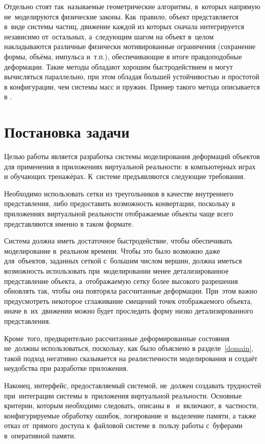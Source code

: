 \documentclass[a4paper, 14pt, titlepage]{extarticle}
\begin{document}
    Отдельно стоят так~называемые геометрические алгоритмы, в~которых напрямую не~моделируются
    физические законы. Как~правило, объект представляется в~виде системы частиц, движение каждой из
    которых сначала интегрируется независимо от~остальных, а~следующим шагом на объект в~целом
    накладываются различные физически мотивированные ограничения (сохранение формы, объёма, импульса
    и~т.п.), обеспечивающие в итоге правдоподобные деформации. Такие методы обладают хорошим
    быстродействием и могут вычисляться параллельно, при этом обладая большей устойчивостью и
    простотой в конфигурации, чем системы масс и пружин. Пример такого метода описывается в \cite{mueller-meshless}.

  \section{Постановка задачи}

    Целью работы является разработка системы моделирования деформаций объектов для применения в
    приложениях виртуальной реальности: в компьютерных играх и обучающих тренажёрах.
    К~системе предъявляются следующие требования.

    Необходимо использовать сетки из треугольников в качестве внутреннего представления, либо
    предоставить возможность конвертации, поскольку в приложениях виртуальной реальности отображаемые объекты
    чаще всего представляются именно в таком формате.

    Система должна иметь достаточное быстродействие, чтобы обеспечивать моделирование в~реальном
    времени. Чтобы это было возможно даже для~объектов, заданных сеткой с~большим числом вершин,
    должна иметься возможность использовать при~моделировании менее детализированное представление
    объекта, а~отображаемую сетку более высокого разрешения обновлять так, чтобы она повторяла
    рассчитанные деформации. При~этом важно предусмотреть некоторое сглаживание смещений точек
    отображаемого объекта, иначе в~их~движении можно будет проследить форму низко детализированного
    представления.

    Кроме~того, предварительно рассчитанные деформированные состояния не~должны использоваться,
    поскольку, как было объяснено в разделе~\ref{domain}, такой подход негативно сказывается на реалистичности
    моделирования и создаёт неудобства при разработке приложения.

    Наконец, интерфейс, предоставляемый системой, не~должен создавать трудностей при~интеграции
    системы в~приложения виртуальной реальности. Основные критерии, которым необходимо следовать,
    описаны в~\cite{gems-middleware} и~включают, в~частности, конфигурируемые обработку ошибок,
    логирование и~выделение памяти, а также отказ от~прямого доступа к~файловой системе в~пользу
    работы с~буферами в~оперативной памяти.
\end{document}
